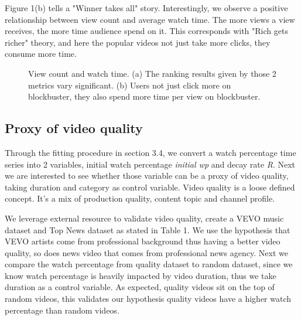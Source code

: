 Figure 1(b) tells a "Winner takes all" story. Interestingly, we observe a positive relationship between view count and average watch time. The more views a view receives, the more time audience spend on it. This corresponds with "Rich gets richer" theory, and here the popular videos not just take more clicks, they consume more time.

\begin{figure}
\caption{View count and watch time. (a) The ranking results given by those 2 metrics vary significant. (b) Users not just click more on blockbuster, they also spend more time per view on blockbuster.}
\end{figure}

\subsection{Proxy of video quality}

Through the fitting procedure in section 3.4, we convert a watch percentage time series into 2 variables, initial watch percentage \textit{initial wp} and decay rate \textit{R}. Next we are interested to see whether those variable can be a proxy of video quality, taking duration and category as control variable. Video quality is a loose defined concept. It's a mix of production quality, content topic and channel profile.

We leverage external resource to validate video quality, create a VEVO music dataset and Top News dataset as stated in Table 1. We use the hypothesis that VEVO artists come from professional background thus having a better video quality, so does news video that comes from professional news agency. Next we compare the watch percentage from quality dataset to random dataset, since we know watch percentage is heavily impacted by video duration, thus we take duration as a control variable. As expected, quality videos sit on the top of random videos, this validates our hypothesis quality videos have a higher watch percentage than random videos.

